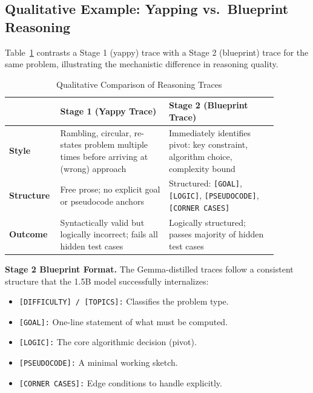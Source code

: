 \documentclass[preprint,12pt]{elsarticle}
\begin{document}
\subsection{Qualitative Example: Yapping vs.\ Blueprint Reasoning}

Table~\ref{tab:qualitative} contrasts a Stage 1 (yappy) trace with a Stage 2 (blueprint) trace for the same problem, illustrating the mechanistic difference in reasoning quality.

\begin{table}[H]
    \centering
    \caption{Qualitative Comparison of Reasoning Traces}
    \label{tab:qualitative}
    \begin{tabular}{p{0.12\linewidth} p{0.38\linewidth} p{0.38\linewidth}}
        \toprule
                           & \textbf{Stage 1 (Yappy Trace)}                                                           & \textbf{Stage 2 (Blueprint Trace)}                                                            \\
        \midrule
        \textbf{Style}     & Rambling, circular, re-states problem multiple times before arriving at (wrong) approach & Immediately identifies pivot: key constraint, algorithm choice, complexity bound              \\
        \midrule
        \textbf{Structure} & Free prose; no explicit goal or pseudocode anchors                                       & Structured: \texttt{[GOAL]}, \texttt{[LOGIC]}, \texttt{[PSEUDOCODE]}, \texttt{[CORNER CASES]} \\
        \midrule
        \textbf{Outcome}   & Syntactically valid but logically incorrect; fails all hidden test cases                 & Logically structured; passes majority of hidden test cases                                    \\
        \bottomrule
    \end{tabular}
\end{table}

\textbf{Stage 2 Blueprint Format.} The Gemma-distilled traces follow a consistent structure that the 1.5B model successfully internalizes:
\begin{itemize}
    \item \texttt{[DIFFICULTY] / [TOPICS]:} Classifies the problem type.
    \item \texttt{[GOAL]:} One-line statement of what must be computed.
    \item \texttt{[LOGIC]:} The core algorithmic decision (pivot).
    \item \texttt{[PSEUDOCODE]:} A minimal working sketch.
    \item \texttt{[CORNER CASES]:} Edge conditions to handle explicitly.
\end{itemize}
\end{document}
